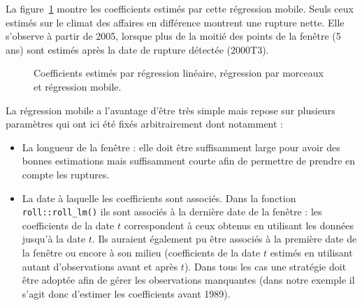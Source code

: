 \documentclass[
  a4paper,
  DIV=11,
  numbers=noendperiod,
  french]{scrartcl}
\newcommand\1{{\mathds 1}}
\theoremstyle{remark}
\begin{document}
La figure~\ref{fig-coef-rollreg} montre les coefficients estimés par
cette régression mobile. Seuls ceux estimés sur le climat des affaires
en différence montrent une rupture nette. Elle s'observe à partir de
2005, lorsque plus de la moitié des points de la fenêtre (5 ans) sont
estimés après la date de rupture détectée (2000T3).

\begin{figure}

\caption{\label{fig-coef-rollreg}Coefficients estimés par régression
linéaire, régression par morceaux et régression mobile.}


\end{figure}%

La régression mobile a l'avantage d'être très simple mais repose sur
plusieurs paramètres qui ont ici été fixés arbitrairement dont notamment
:

\begin{itemize}
\item
  La longueur de la fenêtre : elle doit être suffisamment large pour
  avoir des bonnes estimations mais suffisamment courte afin de
  permettre de prendre en compte les ruptures.
\item
  La date à laquelle les coefficients sont associés. Dans la fonction
  \texttt{roll::roll\_lm()} ils sont associés à la dernière date de la
  fenêtre : les coefficients de la date \(t\) correspondent à ceux
  obtenus en utilisant les données jusqu'à la date \(t.\) Ils auraient
  également pu être associés à la première date de la fenêtre ou encore
  à son milieu (coefficients de la date \(t\) estimés en utilisant
  autant d'observations avant et après \(t\)). Dans tous les cas une
  stratégie doit être adoptée afin de gérer les observations manquantes
  (dans notre exemple il s'agit donc d'estimer les coefficients avant
  1989).
\end{itemize}
\end{document}
